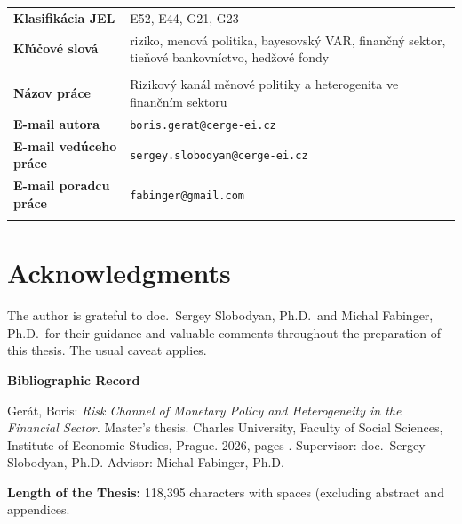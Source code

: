 \documentclass[12pt,a4paper]{report}
\begin{document}
\bigskip

\begin{tabular}{lp{7.7cm}}
  \textbf{Klasifik\'{a}cia JEL}      & E52, E44, G21, G23 \\
  \textbf{K\v{l}\'{u}\v{c}ov\'{e} slov\'{a}} & riziko, menov\'{a} politika,
                                   bayesovsk\'{y} VAR, finan\v{c}n\'{y}
                                   sektor, tie\v{n}ov\'{e} bankovn\'{i}ctvo,
                                   hed\v{z}ov\'{e} fondy \\
                                 & \\
   \textbf{N\'{a}zov pr\'{a}ce}  &  Rizikový kanál měnové politiky a heterogenita ve finančním sektoru\\
  \textbf{E-mail autora}         & \texttt{boris.gerat@cerge-ei.cz} \\
  \textbf{E-mail ved\'{u}ceho pr\'{a}ce} & \texttt{sergey.slobodyan@cerge-ei.cz} \\
  \textbf{E-mail poradcu pr\'{a}ce} & \texttt{fabinger@gmail.com} \\\\
\end{tabular}

\clearpage

\chapter*{Acknowledgments}
The author is grateful to doc.\ Sergey Slobodyan, Ph.D.\ and Michal
Fabinger, Ph.D.\ for their guidance and valuable comments throughout the
preparation of this thesis. The usual caveat applies.

\bigskip\bigskip

\noindent\textbf{Bibliographic Record}

\medskip

\noindent Ger\'{a}t, Boris: \textit{Risk Channel of Monetary Policy and
Heterogeneity in the Financial Sector.} Master's thesis.
Charles University, Faculty of Social Sciences, Institute of Economic Studies,
Prague. 2026, pages \pageref{LastPage}. Supervisor: doc.\ Sergey
Slobodyan, Ph.D. Advisor: Michal Fabinger, Ph.D.

\medskip

\noindent \textbf{Length of the Thesis:} 118,395 characters with spaces (excluding abstract and appendices.
\clearpage

\pagestyle{fancy}
{}
\tableofcontents
\clearpage
\end{document}

